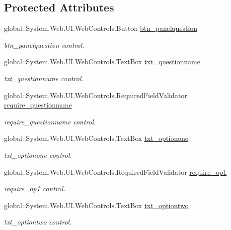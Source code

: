 \subsection*{Protected Attributes}
\begin{DoxyCompactItemize}
\item 
global\+::\+System.\+Web.\+U\+I.\+Web\+Controls.\+Button \mbox{\hyperlink{class_admin__addquestion_ab92c21d32da5d15deddf96f5be608ad7}{btn\+\_\+panelquestion}}
\begin{DoxyCompactList}\small\item\em btn\+\_\+panelquestion control. \end{DoxyCompactList}\item 
global\+::\+System.\+Web.\+U\+I.\+Web\+Controls.\+Text\+Box \mbox{\hyperlink{class_admin__addquestion_a901939fe9a1b5f5d33949ca25fe28bfa}{txt\+\_\+questionname}}
\begin{DoxyCompactList}\small\item\em txt\+\_\+questionname control. \end{DoxyCompactList}\item 
global\+::\+System.\+Web.\+U\+I.\+Web\+Controls.\+Required\+Field\+Validator \mbox{\hyperlink{class_admin__addquestion_a3b98200a649b474a5e8d33d139e802da}{require\+\_\+questionname}}
\begin{DoxyCompactList}\small\item\em require\+\_\+questionname control. \end{DoxyCompactList}\item 
global\+::\+System.\+Web.\+U\+I.\+Web\+Controls.\+Text\+Box \mbox{\hyperlink{class_admin__addquestion_a673030a0910c338eef0fbf42646fcbcd}{txt\+\_\+optionone}}
\begin{DoxyCompactList}\small\item\em txt\+\_\+optionone control. \end{DoxyCompactList}\item 
global\+::\+System.\+Web.\+U\+I.\+Web\+Controls.\+Required\+Field\+Validator \mbox{\hyperlink{class_admin__addquestion_a05e73dcf265c906347af369f38402e7a}{require\+\_\+op1}}
\begin{DoxyCompactList}\small\item\em require\+\_\+op1 control. \end{DoxyCompactList}\item 
global\+::\+System.\+Web.\+U\+I.\+Web\+Controls.\+Text\+Box \mbox{\hyperlink{class_admin__addquestion_ac31566c7beee0616f6b351a5dfa0d288}{txt\+\_\+optiontwo}}
\begin{DoxyCompactList}\small\item\em txt\+\_\+optiontwo control. \end{DoxyCompactList}\item 

\end{DoxyCompactItemize}
